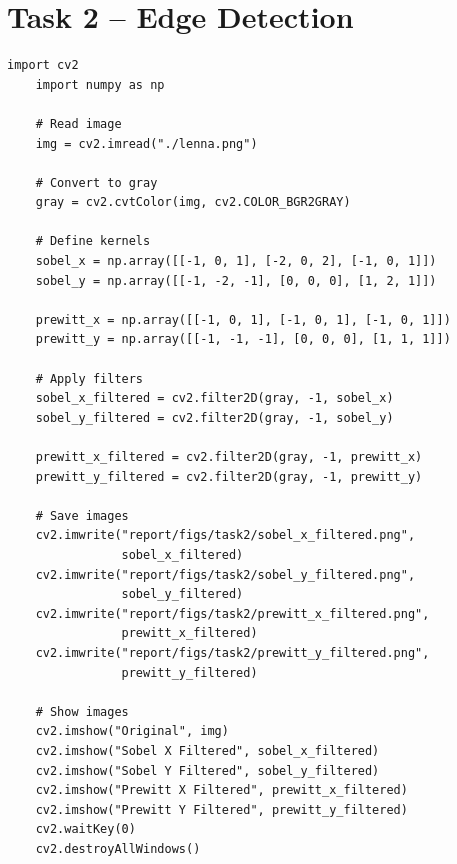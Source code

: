 \documentclass[11pt,a4paper]{article}
\begin{document}
\newpage
\section{Task 2 -- Edge Detection}

\begin{lstlisting}[language=iPython, title=Python Code for Edge Detection]
    import cv2
    import numpy as np
    
    # Read image
    img = cv2.imread("./lenna.png")
    
    # Convert to gray
    gray = cv2.cvtColor(img, cv2.COLOR_BGR2GRAY)
    
    # Define kernels
    sobel_x = np.array([[-1, 0, 1], [-2, 0, 2], [-1, 0, 1]])
    sobel_y = np.array([[-1, -2, -1], [0, 0, 0], [1, 2, 1]])
    
    prewitt_x = np.array([[-1, 0, 1], [-1, 0, 1], [-1, 0, 1]])
    prewitt_y = np.array([[-1, -1, -1], [0, 0, 0], [1, 1, 1]])
    
    # Apply filters
    sobel_x_filtered = cv2.filter2D(gray, -1, sobel_x)
    sobel_y_filtered = cv2.filter2D(gray, -1, sobel_y)
    
    prewitt_x_filtered = cv2.filter2D(gray, -1, prewitt_x)
    prewitt_y_filtered = cv2.filter2D(gray, -1, prewitt_y)
    
    # Save images
    cv2.imwrite("report/figs/task2/sobel_x_filtered.png",
                sobel_x_filtered)
    cv2.imwrite("report/figs/task2/sobel_y_filtered.png",
                sobel_y_filtered)
    cv2.imwrite("report/figs/task2/prewitt_x_filtered.png",
                prewitt_x_filtered)
    cv2.imwrite("report/figs/task2/prewitt_y_filtered.png",
                prewitt_y_filtered)
    
    # Show images
    cv2.imshow("Original", img)
    cv2.imshow("Sobel X Filtered", sobel_x_filtered)
    cv2.imshow("Sobel Y Filtered", sobel_y_filtered)
    cv2.imshow("Prewitt X Filtered", prewitt_x_filtered)
    cv2.imshow("Prewitt Y Filtered", prewitt_y_filtered)
    cv2.waitKey(0)
    cv2.destroyAllWindows()
\end{lstlisting}
\end{document}
